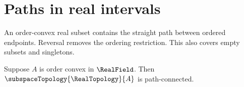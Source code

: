 \section{Paths in real intervals}






An order-convex real subset contains the straight path between ordered
endpoints. Reversal removes the ordering restriction. This also covers empty
subsets and singletons.

\begin{theorem}\label{real_order_convex_set_is_path_connected}
    Suppose $A$ is order convex in $\RealField$.
    Then $\subspaceTopology{\RealTopology}{A}$ is path-connected.
\end{theorem}

